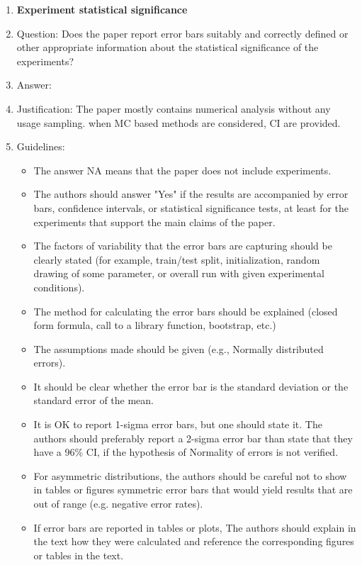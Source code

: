 \documentclass{article}
\theoremstyle{plain}
\theoremstyle{definition}
\begin{document}
\begin{enumerate}
\item {\bf Experiment statistical significance}
    \item[] Question: Does the paper report error bars suitably and correctly defined or other appropriate information about the statistical significance of the experiments?
    \item[] Answer: \answerNA{}
    \item[] Justification: The paper mostly contains numerical analysis without any usage sampling. when MC based methods are considered, CI are provided.
    \item[] Guidelines:
    \begin{itemize}
        \item The answer NA means that the paper does not include experiments.
        \item The authors should answer "Yes" if the results are accompanied by error bars, confidence intervals, or statistical significance tests, at least for the experiments that support the main claims of the paper.
        \item The factors of variability that the error bars are capturing should be clearly stated (for example, train/test split, initialization, random drawing of some parameter, or overall run with given experimental conditions).
        \item The method for calculating the error bars should be explained (closed form formula, call to a library function, bootstrap, etc.)
        \item The assumptions made should be given (e.g., Normally distributed errors).
        \item It should be clear whether the error bar is the standard deviation or the standard error of the mean.
        \item It is OK to report 1-sigma error bars, but one should state it. The authors should preferably report a 2-sigma error bar than state that they have a 96\% CI, if the hypothesis of Normality of errors is not verified.
        \item For asymmetric distributions, the authors should be careful not to show in tables or figures symmetric error bars that would yield results that are out of range (e.g. negative error rates).
        \item If error bars are reported in tables or plots, The authors should explain in the text how they were calculated and reference the corresponding figures or tables in the text.
    \end{itemize}


\end{enumerate}
\end{document}
